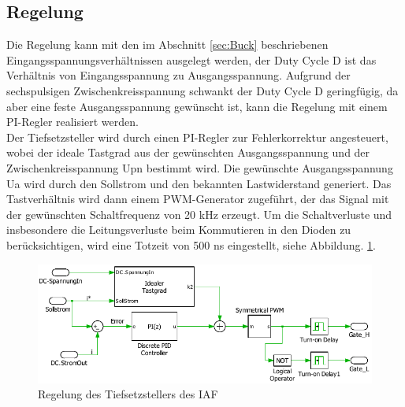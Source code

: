 	\subsection{Regelung}
	Die Regelung kann mit den im Abschnitt \ref{sec:Buck} beschriebenen Eingangsspannungsverhältnissen ausgelegt werden, der Duty Cycle \gls{D} ist das Verhältnis von Eingangsspannung zu Ausgangsspannung. Aufgrund der sechspulsigen Zwischenkreisspannung schwankt der Duty Cycle \gls{D} geringfügig, da aber eine feste Ausgangsspannung gewünscht ist, kann die Regelung mit einem PI-Regler realisiert werden.\\
	Der Tiefsetzsteller wird durch einen PI-Regler zur Fehlerkorrektur angesteuert, wobei der ideale Tastgrad aus der gewünschten Ausgangsspannung und der Zwischenkreisspannung \gls{Upn} bestimmt wird. Die gewünschte Ausgangsspannung \gls{Ua} wird durch den Sollstrom und den bekannten Lastwiderstand generiert. Das Tastverhältnis wird dann einem PWM-Generator zugeführt, der das Signal mit der gewünschten Schaltfrequenz von 20 kHz erzeugt. Um die Schaltverluste und insbesondere die Leitungsverluste beim Kommutieren in den Dioden zu berücksichtigen, wird eine Totzeit von 500 \si{\nano \second} eingestellt, siehe Abbildung. \ref{fig:iafbuckcontrol}.
	\begin{figure}[H]
		\centering
		\includegraphics[width=0.9\linewidth]{content/Grafiken/IAF_BuckControl}
		\caption{Regelung des Tiefsetzstellers des IAF}
		\label{fig:iafbuckcontrol}
	\end{figure}


